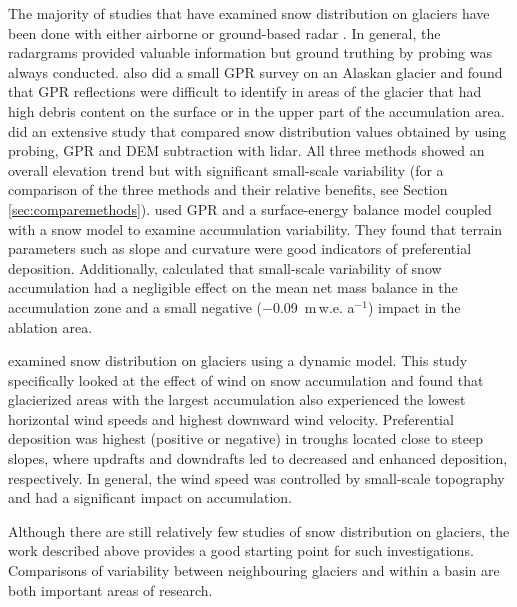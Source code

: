 \documentclass{sfuthesis}
\begin{document}
The majority of studies that have examined snow distribution on glaciers have been done with either airborne or ground-based radar \citep[e.g.][]{Winther1998,Machguth2006, Grabiec2011, Pelt2014,McGrath2015}. In general, the radargrams provided valuable information but ground truthing by probing was always conducted. \cite{Gusmeroli2014} also did a small GPR survey on an Alaskan glacier and found that GPR reflections were difficult to identify in areas of the glacier that had high debris content on the surface or in the upper part of the accumulation area. \cite{Sold2013} did an extensive study that compared snow distribution values obtained by using probing, GPR and DEM subtraction with lidar. All three methods showed an overall elevation trend but with significant small-scale variability (for a comparison of the three methods and their relative benefits, see Section \ref{sec:comparemethods}). \cite{Pelt2014} used GPR and a surface-energy balance model coupled with a snow model to examine accumulation variability. They found that terrain parameters such as slope and curvature were good indicators of preferential deposition. Additionally, \cite{Pelt2014} calculated that small-scale variability of snow accumulation had a negligible effect on the mean net mass balance in the accumulation zone and a small negative ($-$0.09 \,m\,w.e. a$^{-1}$) impact in the ablation area.

\cite{Dadic2010} examined snow distribution on glaciers using a dynamic model. This study specifically looked at the effect of wind on snow accumulation and found that glacierized areas with the largest accumulation also experienced the lowest horizontal wind speeds and highest downward wind velocity. Preferential deposition was highest (positive or negative) in troughs located close to steep slopes, where updrafts and downdrafts led to decreased and enhanced deposition, respectively. In general, the wind speed was controlled by small-scale topography and had a significant impact on accumulation. 

Although there are still relatively few studies of snow distribution on glaciers, the work described above provides a good starting point for such investigations. Comparisons of variability between neighbouring glaciers and within a basin are both important areas of research.
\end{document}
